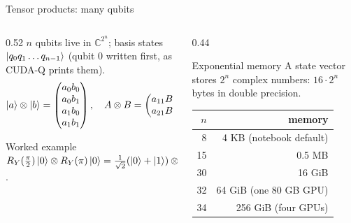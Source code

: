 \documentclass[aspectratio=169,11pt]{beamer}
\begin{document}
\begin{frame}[label=fTensor]{Tensor products: many qubits}
  \begin{columns}[T]
    \begin{column}{0.52\textwidth}
      \small
      $n$ qubits live in $\mathbb C^{2^n}$; basis states $\ket{q_0q_1\dots q_{n-1}}$ (qubit 0 written first, as CUDA-Q prints them).
      \[ \ket a\otimes\ket b = \begin{pmatrix}a_0b_0\\ a_0b_1\\ a_1b_0\\ a_1b_1\end{pmatrix},\quad
         A\otimes B = \begin{pmatrix}a_{11}B & a_{12}B\\ a_{21}B & a_{22}B\end{pmatrix}. \]
      \begin{exampleblock}{Worked example}
        \scriptsize $R_Y(\frac\pi2)\ket0\otimes R_Y(\pi)\ket0 = \frac{1}{\sqrt2}(\ket0 + \ket1)\otimes\ket1 = \frac{1}{\sqrt2}(0, 1, 0, 1)^{\mathsf T}$.
      \end{exampleblock}
    \end{column}
    \begin{column}{0.44\textwidth}
      \begin{alertblock}{Exponential memory}
        \small A state vector stores $2^n$ complex numbers: $16\cdot2^n$ bytes in double precision.
        \begin{center}\footnotesize
        \begin{tabular}{rr}\toprule $n$ & memory\\ \midrule 8 & 4 KB (notebook default)\\ 15 & 0.5 MB\\ 30 & 16 GiB\\ 32 & 64 GiB (one 80 GB GPU)\\ 34 & 256 GiB (four GPUs)\\ \bottomrule\end{tabular}
        \end{center}
      \end{alertblock}
    \end{column}
  \end{columns}
\end{frame}
\end{document}
